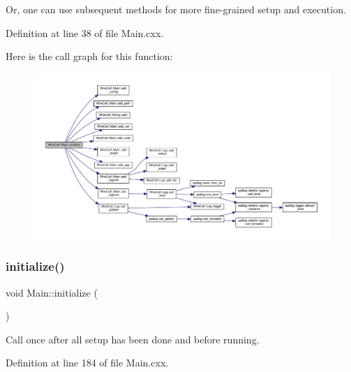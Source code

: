 Or, one can use subsequent methods for more fine-\/grained setup and execution. 

Definition at line 38 of file Main.\+cxx.

Here is the call graph for this function\+:
\nopagebreak
\begin{figure}[H]
\begin{center}
\leavevmode
\includegraphics[width=350pt]{class_wire_cell_1_1_main_a6d6b47f6893cc6474d71d70bf5f8adcb_cgraph}
\end{center}
\end{figure}
\mbox{\label{class_wire_cell_1_1_main_a7cd2683098093ad0f714873a9112543e}} 
\subsubsection{\texorpdfstring{initialize()}{initialize()}}
{\footnotesize\ttfamily void Main\+::initialize (\begin{DoxyParamCaption}{ }\end{DoxyParamCaption})}

Call once after all setup has been done and before running. 

Definition at line 184 of file Main.\+cxx.

